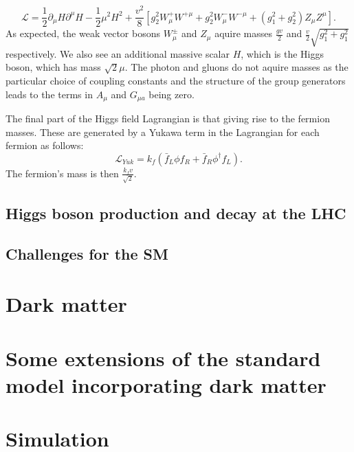 \begin{equation}
  \mathcal{L}=\frac{1}{2}\partial_{\mu}H\partial^{\mu}H-\frac{1}{2}\mu^{2}H^{2}+\frac{v^{2}}{8}\left[g_{2}^{2}W_{\mu}^{+}W^{+\mu}+g_{2}^{2}W_{\mu}^{-}W^{-\mu}+\left(g_{1}^{2}+g_{2}^{2}\right)Z_{\mu}Z^{\mu}\right].
\end{equation}
As expected, the weak vector bosons $W_{\mu}^{\pm}$ and $Z_{\mu}$ aquire masses $\frac{gv}{2}$ and $\frac{v}{2}\sqrt{g_{1}^{2}+g_{1}^{2}}$ respectively. We also see an additional massive scalar $H$, which is the Higgs boson, which has mass $\sqrt{2}\mu$. The photon and gluons do not aquire masses as the particular choice of coupling constants and the structure of the group generators leads to the terms in $A_{\mu}$ and $G_{\mu a}$ being zero.

The final part of the Higgs field Lagrangian is that giving rise to the fermion masses. These are generated by a Yukawa term in the Lagrangian for each fermion as follows:
\begin{equation}
  \mathcal{L}_{Yuk}=k_{f}\left(\bar{f}_{L}\phi f_{R}+\bar{f}_{R}\phi^{\dag}f_{L}\right).
\end{equation}
The fermion's mass is then $\frac{k_{f}v}{\sqrt{2}}$.







\subsection{Higgs boson production and decay at the LHC}
\label{sec:higprod}
\subsection{Challenges for the SM}
\label{sec:SMchallenges}


\section{Dark matter}
\label{sec:DM}

\section{Some extensions of the standard model incorporating dark matter}
\label{sec:DMextensions}

\section{Simulation}
